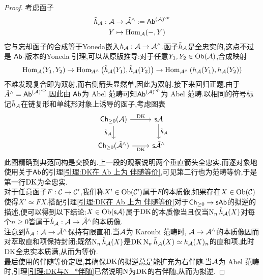 \begin{proof}
    考虑函子
    \begin{align*}
    \tilde{h}_{\cal{A}}: \cal{A} &\to \tilde{\cal{A}}^{\land} := \mathsf{Ab}^{(\cal{A})^{\operatorname{op}}}\\
    Y &\mapsto \operatorname{Hom}_{\cal{A}}(-,Y)
    \end{align*}
    它与忘却函子的合成等于Yoneda嵌入$h_{\cal{A}} : \cal{A} \to \cal{A}^{\land}$.函子$\tilde{h}_{\cal{A}}$是全忠实的,这点不过是 $\mathsf{Ab}$-版本的Yoneda 引理,可以从原版推导:对于任意$Y_1 ,Y_2 \in \operatorname{Ob}(\cal{A})$,合成映射
    \[
    \operatorname{Hom}_{\cal{A}}(Y_1,Y_2) \to \operatorname{Hom}_{\tilde\cal{A}^{\land}}\left(\tilde{h}_{\cal{A}}(Y_1),\tilde{h}_{\cal{A}}(Y_2)\right)\to \operatorname{Hom}_{\cal{A}^{\land}}\left(h_{\cal{A}}(Y_1),h_{\cal{A}}(Y_2)\right)
    \]
    不难发现复合即为双射,而右侧箭头显然单,因此为双射.接下来回归正题.由于$\tilde{A}^{\land}= \mathsf{Ab}^{(\cal{A})^{\operatorname{op}}}$,因此由 $\mathsf{Ab}$为 Abel 范畴可知$\mathsf{Ab}^{(\cal{A})^{\operatorname{op}}}$为 Abel 范畴.以相同的符号标记$\tilde{h}_{\cal{A}}$在链复形和单纯形对象上诱导的函子,考虑图表
    \[\begin{tikzcd}
	{\Chain_{\geq 0}(\cal{A})} & {\mathsf{s}\cal{A}} \\
	{\Chain_{\geq 0}(\tilde{\cal{A}}^{\land})} & {\mathsf{s}\tilde{\cal{A}}^{\land}}
	\arrow["\DK", from=1-1, to=1-2]
	\arrow["{\tilde{h}_{\cal{A}}}"', from=1-1, to=2-1]
	\arrow["{\tilde{h}_{\cal{A}}}", from=1-2, to=2-2]
	\arrow["\DK"', from=2-1, to=2-2]
    \end{tikzcd}\]
    此图精确到典范同构是交换的.上一段的观察说明两个垂直箭头全忠实,而逐对象地使用关于$\mathsf{Ab}$的引理\ref{引理:DK在 Ab 上为 伴随等价},可见第二行也为范畴等价,于是第一行$\operatorname{DK}$为全忠实.\\

    对于任意函子$F: \cal{C} \to \cal{C}'$,我们称$X'\in \operatorname{Ob}(\cal{C}')$属于$F$的本质像,如果存在$X\in \operatorname{Ob}(\cal{C})$使得$X'\simeq FX$.搭配引理\ref{引理:DK在 Ab 上为 伴随等价}对于$\mathsf{Ch}_{\geq 0} \to \mathsf{sAb}$的拟逆的描述,便可以得到以下结论:$X\in \operatorname{Ob}(\mathsf{s}\cal{A})$属于$\operatorname{DK}$的本质像当且仅当$\operatorname{N}_n\tilde{h}_{\cal{A}}(X)$对每个$n \geq 0$皆属于$\tilde{h}_{\cal{A}}: \cal{A} \to \tilde{\cal{A}}^{\land}$的本质像.\\
    注意到$\tilde{h}_{\cal{A}}: \cal{A} \to \tilde{\cal{A}}^{\land}$保持有限直和.当$\cal{A}$为 Karoubi 范畴时, $\cal{A} \to \tilde{\cal{A}}^{\land}$的本质像因而对萃取直和项保持封闭;既然$\operatorname{N}_n\tilde{h}_{\cal{A}}(X)$是$\operatorname{DK}\operatorname{N}_n\tilde{h}_{\cal{A}}(X)\simeq h_{\cal{A}}(X)_n$的直和项,此时$\operatorname{DK}$全忠实本质满,从而为等价.\\
    最后使用\parencite[定理 2.6.12]{李文威卷一}的伴随等价定理,其确保$\operatorname{DK}$的拟逆总是能扩充为右伴随.当$\cal{A}$为 Abel 范畴时,引理\ref{引理:DK与N_*伴随}已然说明$\operatorname{N}$为$\operatorname{DK}$的右伴随,从而为拟逆.
\end{proof}

